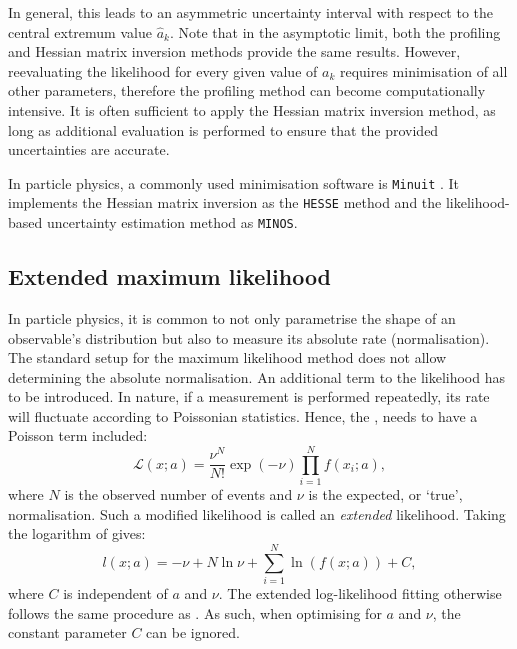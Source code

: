 In general, this leads to an asymmetric uncertainty interval with respect to the central extremum value $\hat{a}_k$.
Note that in the asymptotic limit, both the profiling and Hessian matrix inversion methods provide the same results.
However, reevaluating the likelihood for every given value of $a_k$ requires minimisation of all other parameters, 
therefore the profiling method can become computationally intensive. 
It is often sufficient to apply the Hessian matrix inversion method, 
as long as additional evaluation is performed to ensure that the provided uncertainties are accurate.

In particle physics, a commonly used minimisation software is \texttt{Minuit} \cite{James:1975dr,James:2296388}.
It implements the Hessian matrix inversion as the \texttt{HESSE} method and the likelihood-based uncertainty estimation method as \texttt{MINOS}.
\subsection{Extended maximum likelihood}

In particle physics, it is common to not only parametrise the shape of an observable's distribution but also to measure its absolute rate (normalisation).
The standard setup for the maximum likelihood method does not allow determining the absolute normalisation. 
An additional term to the likelihood has to be introduced.
In nature, if a measurement is performed repeatedly, its rate will fluctuate according to Poissonian statistics.
Hence, the , needs to have a Poisson term included:
\begin{equation}\label{eq:extended_likelihood}
    \mathcal{L}(x;a) = \frac{\nu^N}{N!}\exp(-\nu)\prod_{i=1}^N f(x_i;a),
\end{equation}
where $N$ is the observed number of events and $\nu$ is the expected, or `true', normalisation. 
Such a modified likelihood is called an \textit{extended} likelihood.
Taking the logarithm of  gives:
\begin{equation}\label{eq:extended_log_likelihood}
    l(x;a) = -\nu + N\ln{\nu} + \sum_{i=1}^N \ln (f(x;a)) + C,
\end{equation}
where $C$ is independent of $a$ and $\nu$. 
The extended log-likelihood fitting otherwise follows the same procedure as .
As such, when optimising  for $a$ and $\nu$, the constant parameter $C$ can be ignored.

